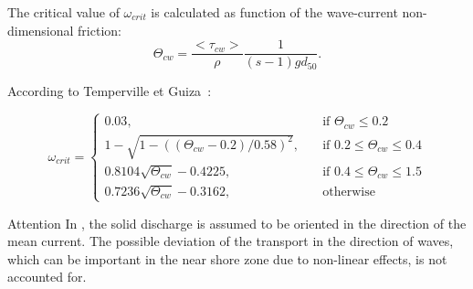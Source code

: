\begin{itemize}
\begin{enumerate}
\end{enumerate}

The critical value of $\omega_{crit}$ is calculated as function of the
wave-current non-dimensional friction:
\begin{equation*}
\Theta_{cw} = \frac{<\tau_{cw} >}{\rho}\frac{1}{(s-1)gd_{50}}. 
\end{equation*}

According to Temperville et Guiza~\cite{2000}: 

\begin{equation*}
\omega_{crit} = \left\{\begin{array}{ll}
\displaystyle
0.03, & \quad\text{if }\Theta_{cw}\leq 0.2 \\
1-\sqrt{1-((\Theta_{cw}-0.2)/0.58)^2}, & \quad\text{if } 0.2\leq\Theta_{cw}\leq 0.4 \\  
\displaystyle
0.8104\sqrt{\Theta_{cw}} - 0.4225, & \quad\text{if } 0.4\leq\Theta_{cw}\leq 1.5\\  
\displaystyle
0.7236\sqrt{\Theta_{cw}} - 0.3162, & \quad\text{otherwise}
\end{array}
\right.
\end{equation*}

\end{itemize}

\begin{bclogo}[couleur = blue!10, arrondi = 0.10, logo = \bcattention]{\textsf{Attention}}
In \sisyphe, the solid discharge is assumed to be oriented in the direction of the mean current.
The possible deviation of the transport in the direction of waves, which can
be important in the near shore zone due to non-linear effects, is not
accounted for.
\end{bclogo}
